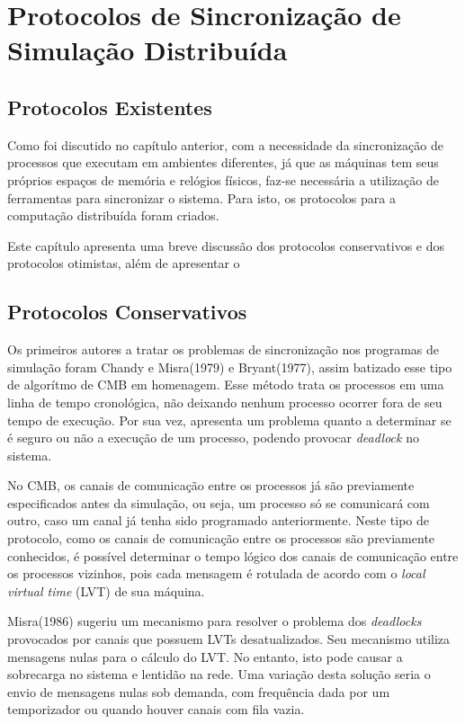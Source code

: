 \chapter{Protocolos de Sincronização de Simulação Distribuída}

\section{Protocolos Existentes}
\label{cap:protocolos}

Como foi discutido no capítulo anterior, com a necessidade da sincronização de processos que executam em ambientes diferentes, já que as máquinas tem seus próprios espaços de memória e relógios físicos, faz-se necessária a utilização de ferramentas para sincronizar o sistema. Para isto, os protocolos para a computação distribuída foram criados.

Este capítulo apresenta uma breve discussão dos protocolos conservativos e dos protocolos otimistas, além de apresentar o 

\section{Protocolos Conservativos}
\label{sec:protocons}

	Os primeiros autores a tratar os problemas de sincronização nos programas de simulação foram Chandy e Misra(1979) e Bryant(1977), assim batizado esse tipo de algorítmo de CMB em homenagem\cite{CMB1,CMB2}. Esse método trata os processos em uma linha de tempo cronológica, não deixando nenhum processo ocorrer fora de seu tempo de execução. Por sua vez, apresenta um problema quanto a determinar se é seguro ou não a execução de um processo, podendo provocar \textit{deadlock} no sistema.

		No CMB, os canais de comunicação entre os processos já são previamente especificados antes da simulação, ou seja, um processo só se comunicará com outro, caso um canal já tenha sido programado anteriormente.	Neste tipo de protocolo, como os canais de comunicação entre os processos são previamente conhecidos, é possível determinar o tempo lógico dos canais de comunicação entre os processos vizinhos, pois cada mensagem é rotulada de acordo com o \textit{local virtual time} (LVT) de sua máquina. 
	
Misra(1986) sugeriu um mecanismo para resolver o problema dos \textit{deadlocks} provocados por canais que possuem LVTs desatualizados. Seu mecanismo utiliza mensagens nulas para o cálculo do LVT. No entanto, isto pode causar a sobrecarga no sistema e lentidão na rede. Uma variação desta solução seria o envio de mensagens nulas sob demanda, com frequência dada por um temporizador ou quando houver canais com fila vazia.

